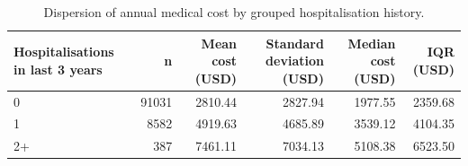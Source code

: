 \begin{table}
\caption{Dispersion of annual medical cost by grouped hospitalisation history.}
\label{tab:02-variance-by-hospitalisation}
\begin{tabular}{lrrrrr}
\toprule
Hospitalisations in last 3 years & n & Mean cost (USD) & Standard deviation (USD) & Median cost (USD) & IQR (USD) \\
\midrule
0 & 91031 & 2810.44 & 2827.94 & 1977.55 & 2359.68 \\
1 & 8582 & 4919.63 & 4685.89 & 3539.12 & 4104.35 \\
2+ & 387 & 7461.11 & 7034.13 & 5108.38 & 6523.50 \\
\bottomrule
\end{tabular}
\end{table}
